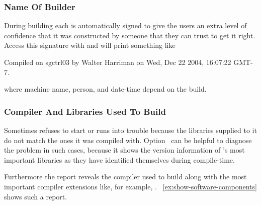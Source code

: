 \subsubsection[Builder]{\label{sec:name-of-builder}%
  Name Of Builder}

During building each \appcmd{} is automatically signed to give the users an extra level of
confidence that it was constructed by someone that they can trust to get it right.  Access this
signature with  and \appcmd{} will print something like

\begin{literal}
  Compiled on sgctrl03 by Walter Harriman on Wed, Dec 22 2004, 16:07:22 GMT-7.
\end{literal}

\noindent where machine name, person, and date-time depend on the
build.


\subsubsection[Compiler And Libraries]{\label{sec:compiler-and-libraries}%
  Compiler And Libraries Used To Build}

Sometimes \appcmd{} refuses to start or runs into trouble because the libraries supplied to it
do not match the ones it was compiled with.  Option~ can be
helpful to diagnose the problem in such cases, because it shows the version information of
\App's most important libraries as they have identified themselves during compile-time.

%
Furthermore the report reveals the compiler used to build \appcmd{} along with the most
important compiler extensions like, for example, .
\exampleName~\ref{ex:show-software-components} shows such a report.

